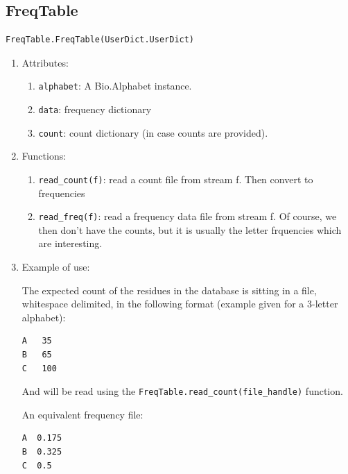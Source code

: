 \documentclass{report}
\begin{document}
\subsection{FreqTable}
\label{sec:freq_table}

\begin{verbatim}
FreqTable.FreqTable(UserDict.UserDict)
\end{verbatim}

\begin{enumerate}

  \item Attributes:
  
  \begin{enumerate}
    \item \verb|alphabet|: A Bio.Alphabet instance.

    \item \verb|data|: frequency dictionary

    \item \verb|count|: count dictionary (in case counts are provided).
  \end{enumerate}
  


  \item Functions:
  
  \begin{enumerate}
    \item \verb|read_count(f)|: read a count file from stream f. Then convert to frequencies

    \item \verb|read_freq(f)|: read a frequency data file from stream f. Of course, we then don't have the counts, but it is usually the letter frquencies which are interesting.

  \end{enumerate}

  \item Example of use:

  The expected count of the residues in the database is sitting in a file, whitespace delimited, in the following format (example given for a 3-letter alphabet):

\begin{verbatim}
A   35
B   65
C   100
\end{verbatim}

And will be read using the \verb|FreqTable.read_count(file_handle)| function. 

An equivalent frequency file:

\begin{verbatim}
A  0.175
B  0.325
C  0.5 
\end{verbatim}


\end{enumerate}
\end{document}
